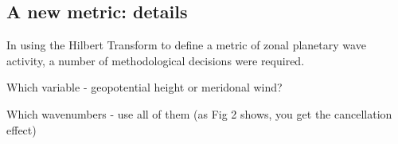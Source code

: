 \subsection{A new metric: details}

In using the Hilbert Transform to define a metric of zonal planetary wave activity, a number of methodological decisions were required. 

Which variable - geopotential height or meridonal wind?

Which wavenumbers - use all of them (as Fig 2 shows, you get the cancellation effect)